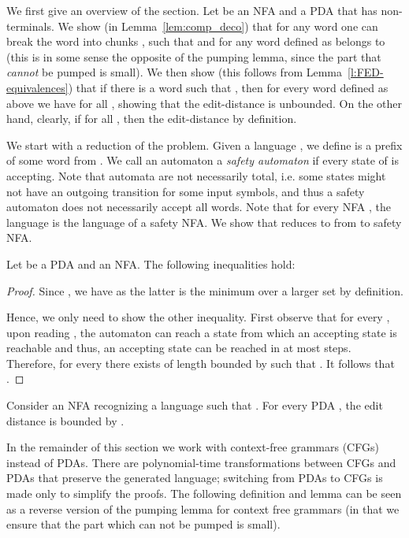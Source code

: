 \documentclass{CSML}
\begin{document}
We first give an overview of the section. Let  be an NFA and  a PDA that has  non-terminals. We show (in Lemma~\ref{lem:comp_deco}) that for any word  one can break the word into chunks , such that  and for any  word  defined as  belongs to  (this is in some sense the opposite of the pumping lemma, since the part that {\em cannot} be pumped is small). We then show (this follows from Lemma~\ref{l:FED-equivalences}) that if there is a word  such that , then for every word  defined as above we have
  for all , showing that the edit-distance  is unbounded. On the other hand, clearly, if  for all , then the edit-distance  by definition.


We start with a reduction of the problem. 
Given a language , we define 
 is a prefix of some word from .
We call an automaton  a \emph{safety automaton} if every state of  is accepting. 
Note that automata are not necessarily total, i.e. some states might not have an outgoing transition for some input symbols, and thus a safety automaton does not necessarily accept all words.
Note that for every NFA , the language  is the language of a safety NFA.
We show that  reduces to  from  to safety NFA. 

\begin{lem}\label{lem:prefix_closure}
Let  be a PDA and  an NFA. The following inequalities 
hold: 

\end{lem}
\begin{proof}
Since , we have 
 as the latter is the minimum over a larger set by definition. 

Hence, we only need to show the other inequality.
First observe that for every , upon reading , the automaton  can reach a state from which an accepting state is reachable and thus, an accepting state can be 
reached in at most  steps. 
Therefore, for every  there exists  of length bounded by  such that 
. It follows that .
\end{proof}

\begin{rem}
Consider an NFA  recognizing a language such that .
For every PDA , the edit distance  is bounded by .
\end{rem}



In the remainder of this section we work with context-free grammars (CFGs) instead of PDAs. There are polynomial-time transformations between CFGs and PDAs that preserve the generated language;
switching from PDAs to CFGs is made only to simplify the proofs. 
The following definition and lemma can be seen as a reverse version of the pumping lemma for context free grammars (in that we ensure that the part which can not be pumped is small). 
\end{document}
